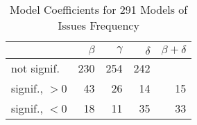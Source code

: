 
\begin{table}[t] \centering
\small
  \caption{Model Coefficients for 291 Models of Issues Frequency}
  \label{Table:rddmodels_freq}
\begin{tabular}{ l  r r r r }        
\hline 

 & $\beta$ & $\gamma$ & $\delta$ & $\beta + \delta$ \\ 
 \hline 
 \hline
not signif. & 230 & 254 & 242 & \\
\hline
signif., $>0$ & 43 & 26 & 14 & 15 \\
\hline
signif., $<0$ & 18 & 11 & 35 & 33 \\
\hline
\end{tabular}
\end{table}